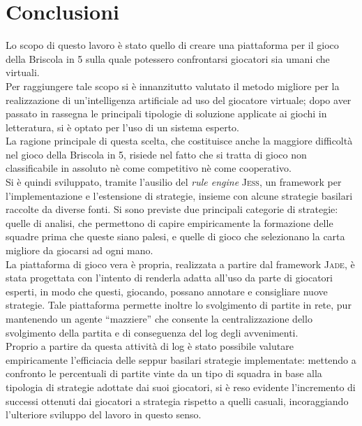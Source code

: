 \def\baselinestretch{1}
\chapter*{Conclusioni}
\graphicspath{{Chapter6/Chapter6Figs/PNG/}{Chapter6/Chapter6Figs/PDF/}{Chapter6/Chapter6Figs/}}

\def\baselinestretch{1.66}

Lo scopo di questo lavoro è stato quello di creare una piattaforma per il gioco della Briscola in 5 sulla quale potessero confrontarsi giocatori sia umani che virtuali.\\
Per raggiungere tale scopo si è innanzitutto valutato il metodo migliore per la realizzazione di un'intelligenza artificiale ad uso del giocatore virtuale; dopo aver passato in rassegna le principali tipologie di soluzione applicate ai giochi in letteratura, si è optato per l'uso di un sistema esperto.\\
La ragione principale di questa scelta, che costituisce anche la maggiore difficoltà nel gioco della Briscola in 5, risiede nel fatto che si tratta di gioco non classificabile in assoluto nè come competitivo nè come cooperativo.\\
Si è quindi sviluppato, tramite l'ausilio del \emph{rule engine} \textsc{Jess}, un framework per l'implementazione e l'estensione di strategie, insieme con alcune strategie basilari raccolte da diverse fonti. Si sono previste due principali categorie di strategie: quelle di analisi, che permettono di capire empiricamente la formazione delle squadre prima che queste siano palesi, e quelle di gioco che selezionano la carta migliore da giocarsi ad ogni mano.\\
La piattaforma di gioco vera è propria, realizzata a partire dal framework \textsc{Jade}, è stata progettata con l'intento di renderla adatta all'uso da parte di giocatori esperti, in modo che questi, giocando, possano annotare e consigliare nuove strategie.
Tale piattaforma permette inoltre lo svolgimento di partite in rete, pur mantenendo un agente ``mazziere'' che consente la centralizzazione dello svolgimento della partita e di conseguenza del log degli avvenimenti.\\
Proprio a partire da questa attività di log è stato possibile valutare empiricamente l'efficiacia delle seppur basilari strategie implementate: mettendo a confronto le percentuali di partite vinte da un tipo di squadra in base alla tipologia di strategie adottate dai suoi giocatori, si è reso evidente l'incremento di successi ottenuti dai giocatori a strategia rispetto a quelli casuali, incoraggiando l'ulteriore sviluppo del lavoro in questo senso.




